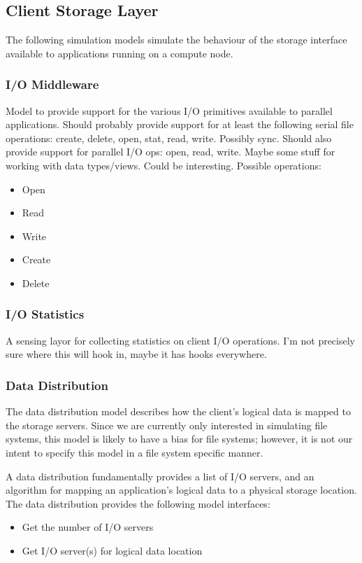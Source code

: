 \documentclass[11pt]{article}
\begin{document}
\subsection{Client Storage Layer}
The following simulation models simulate the behaviour of the storage
interface available to applications running on a compute node.

\subsubsection{I/O Middleware}
Model to provide support for the various I/O primitives available to parallel
applications.  Should probably provide support for at least the following
serial file operations:  create, delete, open, stat, read, write.  Possibly 
sync.  Should also provide support for parallel I/O ops: open, read, write.
Maybe some stuff for working with data types/views.  Could be interesting.
Possible operations:

\begin{itemize}
\item Open
\item Read
\item Write
\item Create
\item Delete
\end{itemize}

\subsubsection{I/O Statistics}
A sensing layor for collecting statistics on client I/O operations.  I'm not
precisely sure where this will hook in, maybe it has hooks everywhere.

\subsubsection{Data Distribution}
The data distribution model describes how the client's logical data is mapped
to the storage servers.  Since we are currently only interested in simulating
file systems, this model is likely to have a bias for file systems; however, it
is not our intent to specify this model in a file system specific manner.

A data distribution fundamentally provides a list of I/O servers, and an
algorithm for mapping an application's logical data to a physical storage
location.  The data distribution provides the following model interfaces:

\begin{itemize}
\item Get the number of I/O servers
\item Get I/O server(s) for logical data location
\end{itemize}
\end{document}
